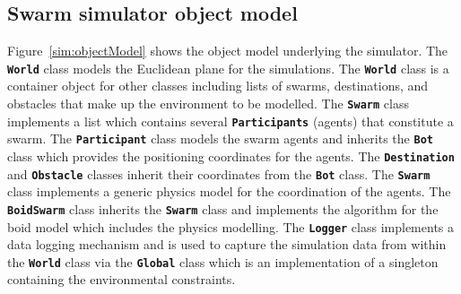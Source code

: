 \subsection{Swarm simulator object model}\label{sim:Simulator3}
Figure~\ref{sim:objectModel} shows the object model underlying the simulator. The \texttt{\textbf{World}} class models the Euclidean plane for the simulations. The \texttt{\textbf{World}} class is a container object for other classes including lists of swarms, destinations, and obstacles that make up the environment to be modelled. The \texttt{\textbf{Swarm}} class implements a list which contains several \texttt{\textbf{Participants}} (agents) that constitute a swarm. The \texttt{\textbf{Participant}} class models the swarm agents and inherits the \texttt{\textbf{Bot}} class which provides the positioning coordinates for the agents. The \texttt{\textbf{Destination}} and \texttt{\textbf{Obstacle}} classes inherit their coordinates from the \texttt{\textbf{Bot}} class. The \texttt{\textbf{Swarm}} class implements a generic physics model for the coordination of the agents. The \texttt{\textbf{BoidSwarm}} class inherits the \texttt{\textbf{Swarm}} class and implements the algorithm for the boid model which includes the physics modelling. The \texttt{\textbf{Logger}} class implements a data logging mechanism and is used to capture the simulation data from within the \texttt{\textbf{World}} class via the \texttt{\textbf{Global}} class which is an implementation of a singleton containing the environmental constraints.

